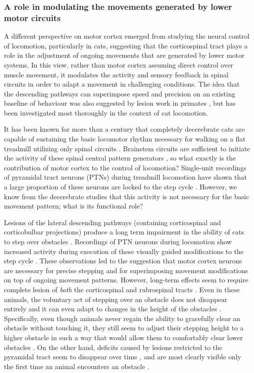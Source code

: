 \subsubsection*{A role in modulating the movements generated by lower motor circuits}

A different perspective on motor cortex emerged from studying the neural control of locomotion, particularly in cats, suggesting that the corticospinal tract plays a role in the adjustment of ongoing movements that are generated by lower motor systems. In this view, rather than motor cortex assuming direct control over muscle movement, it modulates the activity and sensory feedback in spinal circuits in order to adapt a movement in challenging conditions. The idea that the descending pathways can superimpose speed and precision on an existing baseline of behaviour was also suggested by lesion work in primates \cite{Lawrence1968a}, but has been investigated most thoroughly in the context of cat locomotion.

It has been known for more than a century that completely decerebrate cats are capable of sustaining the basic locomotor rhythm necessary for walking on a flat treadmill utilizing only spinal circuits \cite{GrahamBrown1911}. Brainstem circuits are sufficient to initiate the activity of these spinal central pattern generators \cite{Grillner1973}, so what exactly is the contribution of motor cortex to the control of locomotion? Single-unit recordings of pyramidal tract neurons (PTNs) during treadmill locomotion have shown that a large proportion of these neurons are locked to the step cycle \cite{Armstrong1984a}. However, we know from the decerebrate studies that this activity is not necessary for the basic movement pattern; what is its functional role?

Lesions of the lateral descending pathways (containing corticospinal and corticobulbar projections) produce a long term impairment in the ability of cats to step over obstacles \cite{Drew2002}. Recordings of PTN neurons during locomotion show increased activity during execution of these visually guided modifications to the step cycle \cite{Drew1996}. These observations led to the suggestion that motor cortex neurons are necessary for precise stepping and for superimposing movement modifications on top of ongoing movement patterns. However, long-term effects seem to require complete lesion of \emph{both} the corticospinal and rubrospinal tracts \cite{Drew2002}. Even in these animals, the voluntary act of stepping over an obstacle does not disappear entirely and it can even adapt to changes in the height of the obstacles \cite{Drew2002}. Specifically, even though animals never regain the ability to gracefully clear an obstacle without touching it, they still seem to adjust their stepping height to a higher obstacle in such a way that would allow them to comfortably clear lower obstacles \cite{Drew2002}. On the other hand, deficits caused by lesions restricted to the pyramidal tract seem to disappear over time \cite{Liddell1944}, and are most clearly visible only the first time an animal encounters an obstacle \cite{Liddell1944}.


